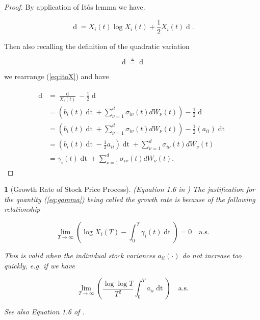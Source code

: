 \documentclass[british]{amsart}
\numberwithin{equation}{section}
\numberwithin{figure}{section}
\theoremstyle{plain}
\newtheorem{thm}{\protect\theoremname}[section]
\theoremstyle{definition}
\theoremstyle{plain}
\theoremstyle{plain}
\theoremstyle{plain}
\theoremstyle{remark}
\theoremstyle{plain}
\providecommand{\theoremname}{Theorem}
\renewcommand{\d}[1]{\mathop{\mathrm{d}{#1}}}
\newcommand{\defeq}{\mathop{\triangleq}}
\newcommand{\almostsurely}{\text{a.s.}}
\begin{document}
\begin{proof}

  By application of It\^{o}s lemma we have.

  \begin{equation} \label{eq:itoX} \d{X_{i}(t)} = X_{i}(t) \log{X_{i}(t)} +
\frac{1}{2} X_{i}(t) \d{ \langle \log{X_{i}} \rangle_{t} }. \end{equation}

  Then also recalling the definition of the quadratic variation

  \begin{equation*} \d{ \langle \log{X_{i}} \rangle_{t} } \defeq \d{ \langle
\log{X_{i}}, \log{X_{i}} \rangle_{t} } \end{equation*}

  we rearrange (\ref{eq:itoX}) and have

  \begin{gather*} \begin{split} \d{\log{X_{i}(t)}} &=
\frac{\d{X_{i}(t)}}{X_{i}(t)} - \frac{1}{2} \d{ \langle \log{X_{i}} \rangle_{t}
} \\ &= \left( b_{i}(t)\d{t} + \sum_{\nu=1}^{d} \sigma_{i\nu}(t) dW_{\nu}(t)
\right) - \frac{1}{2} \d{ \langle \log{X_{i}} \rangle_{t} } \\ &= \left(
b_{i}(t)\d{t} + \sum_{\nu=1}^{d} \sigma_{i\nu}(t) dW_{\nu}(t) \right) -
\frac{1}{2} \left( a_{ii} \right)\d{t} \\ &= \left( b_{i}(t)\d{t} - \frac{1}{2}
a_{ii} \right)\d{t}  + \sum_{\nu=1}^{d} \sigma_{i\nu}(t) dW_{\nu}(t) \\ &=
\gamma_{i}(t) \d{t}  + \sum_{\nu=1}^{d} \sigma_{i\nu}(t) dW_{\nu}(t ).
\end{split} \end{gather*}

\end{proof}

\begin{thm} [Growth Rate of Stock Price Process] \label{thm:growthrate}
(Equation 1.6 in \cite{fernholz2009}) The justification for the quantity
(\ref{eq:gamma}) being called the \textit{growth rate} is because of the
following relationship

  \begin{equation} \lim_{T \to \infty} \left( \log{X_{i}(T)} - \int_{0}^{T}
\gamma_{i}(t)\d{t} \right) = 0 \quad \almostsurely \end{equation}

  This is valid when the individual stock variances $a_{ii}(\cdot)$ do not
increase too quickly, e.g. if we have 


  \begin{equation*} \lim_{T\to\infty} \left( \frac{\log \log T}{T^2}
\int_{0}^{T} a_{ii} \d{t} \right) \quad \almostsurely \end{equation*}

  See also Equation 1.6 of \cite{fernholz2009}.

\end{thm}
\end{document}
